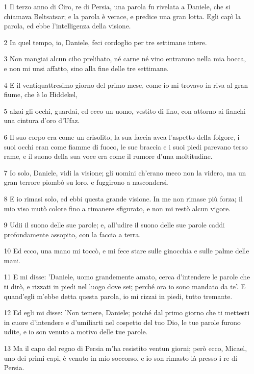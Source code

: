 \par 1 Il terzo anno di Ciro, re di Persia, una parola fu rivelata a Daniele, che si chiamava Beltsatsar; e la parola è verace, e predice una gran lotta. Egli capì la parola, ed ebbe l'intelligenza della visione.
\par 2 In quel tempo, io, Daniele, feci cordoglio per tre settimane intere.
\par 3 Non mangiai alcun cibo prelibato, né carne né vino entrarono nella mia bocca, e non mi unsi affatto, sino alla fine delle tre settimane.
\par 4 E il ventiquattresimo giorno del primo mese, come io mi trovavo in riva al gran fiume, che è lo Hiddekel,
\par 5 alzai gli occhi, guardai, ed ecco un uomo, vestito di lino, con attorno ai fianchi una cintura d'oro d'Ufaz.
\par 6 Il suo corpo era come un crisolito, la sua faccia avea l'aspetto della folgore, i suoi occhi eran come fiamme di fuoco, le sue braccia e i suoi piedi parevano terso rame, e il suono della sua voce era come il rumore d'una moltitudine.
\par 7 Io solo, Daniele, vidi la visione; gli uomini ch'erano meco non la videro, ma un gran terrore piombò su loro, e fuggirono a nascondersi.
\par 8 E io rimasi solo, ed ebbi questa grande visione. In me non rimase più forza; il mio viso mutò colore fino a rimanere sfigurato, e non mi restò alcun vigore.
\par 9 Udii il suono delle sue parole; e, all'udire il suono delle sue parole caddi profondamente assopito, con la faccia a terra.
\par 10 Ed ecco, una mano mi toccò, e mi fece stare sulle ginocchia e sulle palme delle mani.
\par 11 E mi disse: 'Daniele, uomo grandemente amato, cerca d'intendere le parole che ti dirò, e rizzati in piedi nel luogo dove sei; perché ora io sono mandato da te'. E quand'egli m'ebbe detta questa parola, io mi rizzai in piedi, tutto tremante.
\par 12 Ed egli mi disse: 'Non temere, Daniele; poiché dal primo giorno che ti mettesti in cuore d'intendere e d'umiliarti nel cospetto del tuo Dio, le tue parole furono udite, e io son venuto a motivo delle tue parole.
\par 13 Ma il capo del regno di Persia m'ha resistito ventun giorni; però ecco, Micael, uno dei primi capi, è venuto in mio soccorso, e io son rimasto là presso i re di Persia.
